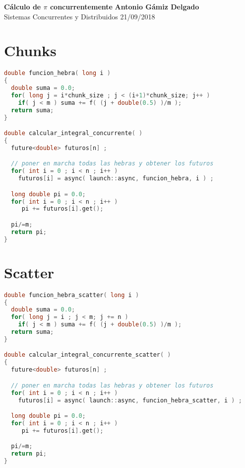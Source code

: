 \documentclass[a4paper, 11pt]{article}
\begin{document}
\noindent
\large\textbf{Cálculo de $\pi$ concurrentemente} \hfill \textbf{Antonio Gámiz Delgado} \\
\normalsize Sistemas Concurrentes y Distribuidos \hfill 21/09/2018

\section*{Chunks}

\begin{lstlisting}[language=C++, caption=piChunk.cpp]
double funcion_hebra( long i )
{
  double suma = 0.0;
  for( long j = i*chunk_size ; j < (i+1)*chunk_size; j++ )
    if( j < m ) suma += f( (j + double(0.5) )/m );
  return suma;
}

double calcular_integral_concurrente( )
{
  future<double> futuros[n] ;

  // poner en marcha todas las hebras y obtener los futuros
  for( int i = 0 ; i < n ; i++ )
    futuros[i] = async( launch::async, funcion_hebra, i ) ;

  long double pi = 0.0;
  for( int i = 0 ; i < n ; i++ )
     pi += futuros[i].get();

  pi/=m;
  return pi;
}
\end{lstlisting}


\section*{Scatter}

\begin{lstlisting}[language=C++, caption=piScatter.cpp]
double funcion_hebra_scatter( long i )
{
  double suma = 0.0;
  for( long j = i ; j < m; j += n )
    if( j < m ) suma += f( (j + double(0.5) )/m );
  return suma;
}

double calcular_integral_concurrente_scatter( )
{
  future<double> futuros[n] ;

  // poner en marcha todas las hebras y obtener los futuros
  for( int i = 0 ; i < n ; i++ )
    futuros[i] = async( launch::async, funcion_hebra_scatter, i ) ;

  long double pi = 0.0;
  for( int i = 0 ; i < n ; i++ )
     pi += futuros[i].get();

  pi/=m;
  return pi;
}
\end{lstlisting}
\end{document}
